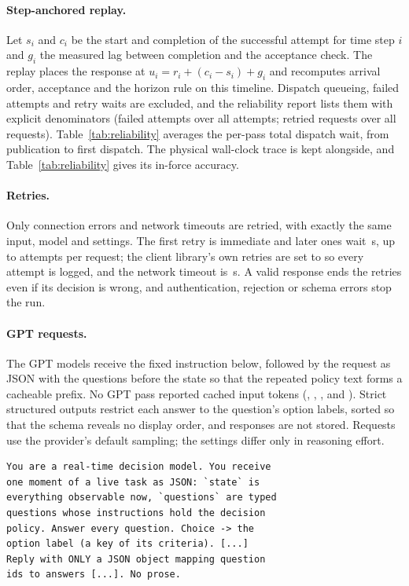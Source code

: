 \paragraph{Step-anchored replay.}
Let $s_i$ and $c_i$ be the start and completion of the successful attempt for time step $i$ and $g_i$ the measured lag between completion and the acceptance check.
The replay places the response at $u_i=r_i+(c_i-s_i)+g_i$ and recomputes arrival order, acceptance and the horizon rule on this timeline.
Dispatch queueing, failed attempts and retry waits are excluded, and the reliability report lists them with explicit denominators (failed attempts over all attempts; retried requests over all requests).
Table~\ref{tab:reliability} averages the per-pass total dispatch wait, from publication to first dispatch.
The physical wall-clock trace is kept alongside, and Table~\ref{tab:reliability} gives its in-force accuracy.

\paragraph{Retries.}
Only connection errors and network timeouts are retried, with exactly the same input, model and settings.
The first retry is immediate and later ones wait \RetryLaterDelaysSec\,s, up to \MaxAttempts{} attempts per request; the client library's own retries are set to \SdkRetries{} so every attempt is logged, and the network timeout is \RequestTimeoutSec\,s.
A valid response ends the retries even if its decision is wrong, and authentication, rejection or schema errors stop the run.

\paragraph{GPT requests.}
The GPT models receive the fixed instruction below, followed by the request as JSON with the questions before the state so that the repeated policy text forms a cacheable prefix.
No GPT pass reported cached input tokens (\LunaCachedTokTotal, \LunaNoneCachedTokTotal, \TerraCachedTokTotal, \TerraNoneCachedTokTotal{} and \AstraCachedTokTotal).
Strict structured outputs restrict each answer to the question's option labels, sorted so that the schema reveals no display order, and responses are not stored. Requests use the provider's default sampling; the settings differ only in reasoning effort.
{\scriptsize
\begin{verbatim}
You are a real-time decision model. You receive
one moment of a live task as JSON: `state` is
everything observable now, `questions` are typed
questions whose instructions hold the decision
policy. Answer every question. Choice -> the
option label (a key of its criteria). [...]
Reply with ONLY a JSON object mapping question
ids to answers [...]. No prose.
\end{verbatim}}

